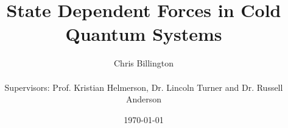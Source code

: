 \title{\Huge State Dependent Forces in Cold Quantum Systems}
\author{\LARGE Chris Billington\\\\
\Large Supervisors: Prof. Kristian Helmerson, Dr. Lincoln Turner and Dr. Russell Anderson}
\date{\today}

\begin{titlingpage}
\setlength{\droptitle}{0.3\textheight}
\maketitle
\restoregeometry
\end{titlingpage}


\tableofcontents
\clearpage
{}
